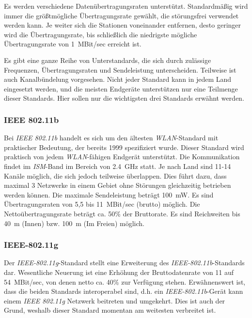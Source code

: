             Es werden verschiedene Datenübertragungsraten unterstützt. Standardmäßig wird
            immer die größtmögliche Übertragungsrate gewählt, die störungsfrei verwendet
            werden kann. Je weiter sich die Stationen voneinander entfernen, desto geringer
            wird die Übertragungsrate, bis schließlich die niedrigste mögliche Übertragungsrate von
            1~MBit/sec erreicht ist.

            Es gibt eine ganze Reihe von Unterstandards, die sich durch zulässige Frequenzen, 
            Übertragungsraten und Sendeleistung unterscheiden. Teilweise ist auch Kanalbündelung 
            vorgesehen. Nicht jeder Standard kann in jedem Land eingesetzt werden, und die meisten
            Endgeräte unterstützen nur eine Teilmenge dieser Standards. Hier sollen nur die
            wichtigsten drei Standards erwähnt werden.

        \subsubsection{IEEE 802.11b}
            Bei \emph{IEEE 802.11b} handelt es sich um den ältesten \emph{WLAN}-Standard mit praktischer
            Bedeutung, der bereits 1999 spezifiziert wurde. Dieser Standard wird praktisch von jedem 
            \emph{WLAN}-fähigen 
            Endgerät unterstützt. Die Kommunikation findet im \emph{ISM}-Band im Bereich von 2.4~GHz
            statt. Je nach Land sind 11-14 Kanäle möglich, die sich jedoch teilweise überlappen.
            Dies führt dazu, dass maximal 3 Netzwerke in einem Gebiet ohne Störungen gleichzeitig betrieben werden
            können. Die maximale Sendeleistung beträgt 100~mW. Es sind Übertragungsraten von 
            5,5 bis 11~MBit/sec (brutto) möglich. Die Nettoübertragungsrate beträgt ca. 50\% der
            Bruttorate. Es sind Reichweiten bis 40~m (Innen) bzw. 100~m (Im Freien) möglich\cite{WirelessNetworking}.

        \subsubsection{IEEE-802.11g}
            Der \emph{IEEE-802.11g}-Standard stellt eine Erweiterung des \emph{IEEE-802.11b}-Standards dar.
            Wesentliche Neuerung ist eine Erhöhung der Bruttodatenrate von 11 auf 54~MBit/sec,
            von denen netto ca. 40\% zur Verfügung stehen. Erwähnenswert ist, dass die
            beiden Standards interoperabel sind, d.h. ein \emph{IEEE-802.11b}-Gerät kann einem
            \emph{IEEE 802.11g} Netzwerk beitreten und umgekehrt. Dies ist auch der Grund, weshalb
            dieser Standard momentan am weitesten verbreitet ist.

